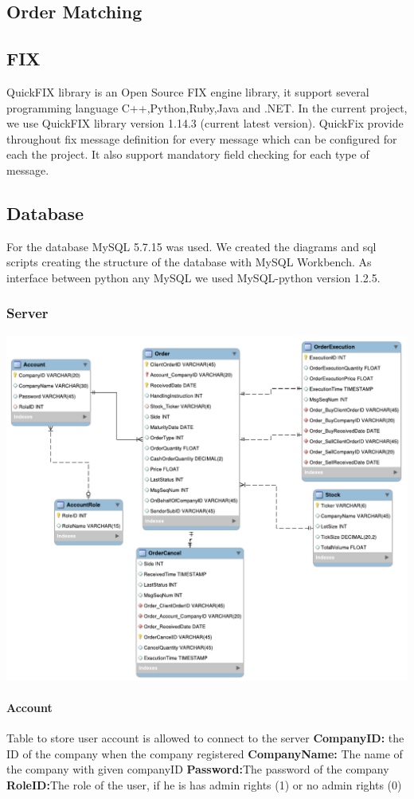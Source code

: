\documentclass[a4paper, 11pt]{article}
\begin{document}
\subsection*{Order Matching}

\subsection*{FIX}
QuickFIX library is an Open Source FIX engine library, it support several programming language C++,Python,Ruby,Java and .NET. 
In the current project, we use QuickFIX library version 1.14.3 (current latest version). QuickFix provide throughout fix message definition for every message which can be configured for each the project.
It also support mandatory field checking for each type of message.
\subsection*{Database}

For the database MySQL 5.7.15 was used. We created the diagrams and sql scripts creating the structure of the database with MySQL Workbench.
As interface between python any MySQL we used MySQL-python version 1.2.5.
\subsubsection*{Server}
\includegraphics{../diagrams/server_database.pdf}

\paragraph*{Account}
Table to store user account is allowed to connect to the server
\textbf{CompanyID:} the ID of the company when the company registered
\textbf{CompanyName:} The name of the company with given companyID
\textbf{Password:}The password of the company
\textbf{RoleID:}The role of the user, if he is has admin rights (1) or no admin rights (0)
\end{document}

